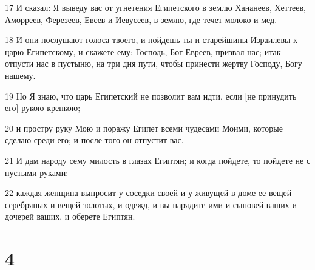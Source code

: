 \par 17 И сказал: Я выведу вас от угнетения Египетского в землю Хананеев, Хеттеев, Аморреев, Ферезеев, Евеев и Иевусеев, в землю, где течет молоко и мед.
\par 18 И они послушают голоса твоего, и пойдешь ты и старейшины Израилевы к царю Египетскому, и скажете ему: Господь, Бог Евреев, призвал нас; итак отпусти нас в пустыню, на три дня пути, чтобы принести жертву Господу, Богу нашему.
\par 19 Но Я знаю, что царь Египетский не позволит вам идти, если [не принудить его] рукою крепкою;
\par 20 и простру руку Мою и поражу Египет всеми чудесами Моими, которые сделаю среди его; и после того он отпустит вас.
\par 21 И дам народу сему милость в глазах Египтян; и когда пойдете, то пойдете не с пустыми руками:
\par 22 каждая женщина выпросит у соседки своей и у живущей в доме ее вещей серебряных и вещей золотых, и одежд, и вы нарядите ими и сыновей ваших и дочерей ваших, и оберете Египтян.

\chapter{4}

